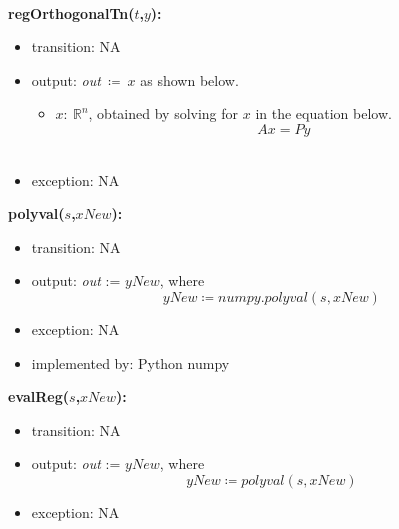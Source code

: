 \documentclass[12pt, titlepage]{article}
\begin{document}
~\newline
~\newline

\noindent \textbf{regOrthogonalTn($t$,$y$):}

\begin{itemize}
	\item transition: NA
	\item output: \textit{out}$\ \coloneqq\ x$ as shown below. 
	\begin{itemize}
		\item $x :\ \mathbb{R}^{n}$, obtained by solving for $x$ in the 
		equation below.	
		\begin{equation*}
		Ax = Py
		\end{equation*}\\
	\end{itemize}
	\item exception: NA
\end{itemize}



\noindent \textbf{polyval($s$,$xNew$):}
\begin{itemize}
	\item transition: NA
	\item output: \textit{out} := $yNew$, where  
	\begin{equation*}
	yNew \coloneqq numpy.polyval(s,xNew)
	\end{equation*}
	\item exception: NA
	\item implemented by: Python numpy
\end{itemize}



\noindent \textbf{evalReg($s$,$xNew$):}
\begin{itemize}
	\item transition: NA
	\item output: \textit{out} := $yNew$, where  
	\begin{equation*}
	yNew \coloneqq polyval(s,xNew)
	\end{equation*}
	\item exception: NA
\end{itemize}

  
\end{document}
